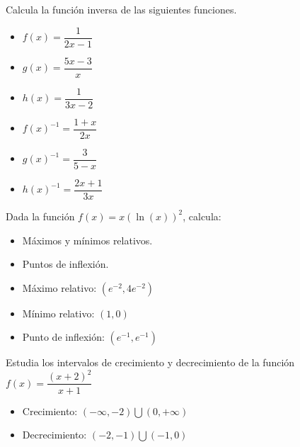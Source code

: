 \begin{ex}
	Calcula la función inversa de las siguientes funciones.
	\begin{itemize}
		\item $f(x) = \dfrac{1}{2x-1}$
		\item $g(x) = \dfrac{5x-3}{x}$
		\item $h(x) = \dfrac{1}{3x-2}$
	\end{itemize}

	\begin{sol}
		\begin{itemize}
			\item $f(x)^{-1} = \dfrac{1+x}{2x}$
			\item $g(x)^{-1} = \dfrac{3}{5-x}$
			\item $h(x)^{-1} = \dfrac{2x+1}{3x}$
		\end{itemize}
	\end{sol}
\end{ex}

\vspace{1cm}


\begin{ex}
	Dada la función $f(x)  = x(\ln (x))^{2}$, calcula:
	\begin{itemize}
		\item Máximos y mínimos relativos.
		\item Puntos de inflexión.
	\end{itemize}
	\begin{sol}
		\begin{itemize}
			\item Máximo relativo: $(e^{-2}, 4e^{-2})$
			\item Mínimo relativo: $(1,0)$
			\item Punto de inflexión: $(e^{-1}, e^{-1})$
		\end{itemize}
	\end{sol}
\end{ex}

\vspace{1cm}


\begin{ex}
	Estudia los intervalos de crecimiento y decrecimiento de la función $f(x) = \dfrac{(x+2)^2}{x+1}$
	\begin{sol}
		\begin{itemize}
			\item Crecimiento: $(-\infty, -2) \bigcup (0, +\infty)$
			\item Decrecimiento: $(-2, -1) \bigcup (-1, 0)$
		\end{itemize}
	\end{sol}
\end{ex}


